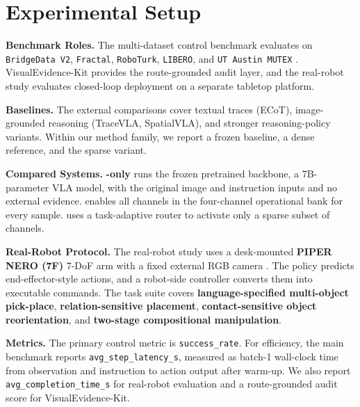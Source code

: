 \section{Experimental Setup}
\label{sec:experiments}

\noindent\textbf{Benchmark Roles.}
The multi-dataset control benchmark evaluates \method{} on \texttt{BridgeData V2}, \texttt{Fractal}, \texttt{RoboTurk}, \texttt{LIBERO}, and \texttt{UT Austin MUTEX} \citep{walke2023bridgedatav2,openx2023,mandlekar2018roboturk,liu2023libero,shah2023mutex}. VisualEvidence-Kit provides the route-grounded audit layer, and the real-robot study evaluates closed-loop deployment on a separate tabletop platform.

\noindent\textbf{Baselines.}
The external comparisons cover textual traces (ECoT), image-grounded reasoning (TraceVLA, SpatialVLA), and stronger reasoning-policy variants. Within our method family, we report a frozen \basevla{} baseline, a dense \fullsoft{} reference, and the sparse \method{} variant.

\noindent\textbf{Compared Systems.}
\textbf{\basevla{}-only} runs the frozen pretrained \openvla{} backbone, a 7B-parameter VLA model, with the original image and instruction inputs and no external evidence. \textbf{\fullsoft{}} enables all channels in the four-channel operational bank for every sample. \textbf{\method{}} uses a task-adaptive router to activate only a sparse subset of channels.

\noindent\textbf{Real-Robot Protocol.}
The real-robot study uses a desk-mounted \textbf{PIPER NERO (7F)} 7-DoF arm with a fixed external RGB camera \citep{kim24openvla,zawalski2024ecot,black2024pi0,black2025pi05,shukor2025smolvla}. The policy predicts end-effector-style actions, and a robot-side controller converts them into executable commands. The task suite covers \textbf{language-specified multi-object pick-place}, \textbf{relation-sensitive placement}, \textbf{contact-sensitive object reorientation}, and \textbf{two-stage compositional manipulation}.

\noindent\textbf{Metrics.}
The primary control metric is \texttt{success\_rate}. For efficiency, the main benchmark reports \texttt{avg\_step\_latency\_s}, measured as batch-1 wall-clock time from observation and instruction to action output after warm-up. We also report \texttt{avg\_completion\_time\_s} for real-robot evaluation and a route-grounded audit score for VisualEvidence-Kit.